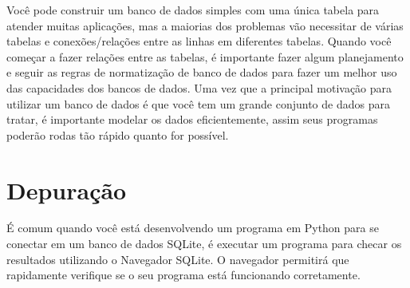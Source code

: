
Você pode construir um banco de dados simples com uma única tabela para
atender muitas aplicações, mas a maiorias dos problemas vão necessitar de
várias tabelas e conexões/relações entre as linhas em diferentes tabelas.
Quando você começar a fazer relações entre as tabelas, é importante fazer
algum planejamento e seguir as regras de normatização de banco de dados
para fazer um melhor uso das capacidades dos bancos de dados. Uma vez que a
principal motivação para utilizar um banco de dados é que você tem um grande
conjunto de dados para tratar, é importante modelar os dados eficientemente,
assim seus programas poderão rodas tão rápido quanto for possível.

\section{Depuração}

É comum quando você está desenvolvendo um programa em Python para se conectar
em um banco de dados SQLite, é executar um programa para checar os resultados
utilizando o Navegador SQLite. O navegador permitirá que rapidamente verifique
se o seu programa está funcionando corretamente.



